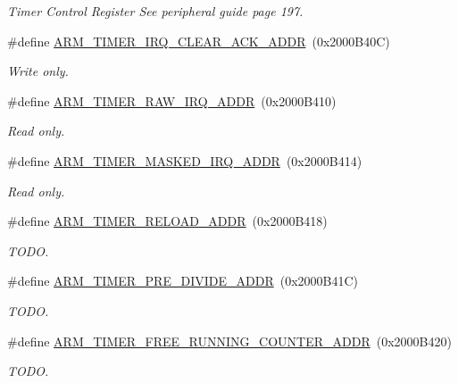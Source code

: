 \begin{DoxyCompactItemize}
\begin{DoxyCompactList}\small\item\em Timer Control Register See peripheral guide page 197. \end{DoxyCompactList}\item 
\#define \hyperlink{group__Peripherals_gab3e45c61e2102e07880830dc96c2fa70}{A\+R\+M\+\_\+\+T\+I\+M\+E\+R\+\_\+\+I\+R\+Q\+\_\+\+C\+L\+E\+A\+R\+\_\+\+A\+C\+K\+\_\+\+A\+D\+DR}~(0x2000\+B40\+C)
\begin{DoxyCompactList}\small\item\em Write only. \end{DoxyCompactList}\item 
\#define \hyperlink{group__Peripherals_ga2ccc9f962edeb13af9b2ef66be86bd3a}{A\+R\+M\+\_\+\+T\+I\+M\+E\+R\+\_\+\+R\+A\+W\+\_\+\+I\+R\+Q\+\_\+\+A\+D\+DR}~(0x2000\+B410)
\begin{DoxyCompactList}\small\item\em Read only. \end{DoxyCompactList}\item 
\#define \hyperlink{group__Peripherals_gaafd52e6e5cdf6b4b409b7e0fbdd05e03}{A\+R\+M\+\_\+\+T\+I\+M\+E\+R\+\_\+\+M\+A\+S\+K\+E\+D\+\_\+\+I\+R\+Q\+\_\+\+A\+D\+DR}~(0x2000\+B414)
\begin{DoxyCompactList}\small\item\em Read only. \end{DoxyCompactList}\item 
\#define \hyperlink{group__Peripherals_ga778de695286e2e164b1abd77fb282cb1}{A\+R\+M\+\_\+\+T\+I\+M\+E\+R\+\_\+\+R\+E\+L\+O\+A\+D\+\_\+\+A\+D\+DR}~(0x2000\+B418)
\begin{DoxyCompactList}\small\item\em T\+O\+DO. \end{DoxyCompactList}\item 
\#define \hyperlink{group__Peripherals_ga287e1e99292423e3f652a70f0e7b8462}{A\+R\+M\+\_\+\+T\+I\+M\+E\+R\+\_\+\+P\+R\+E\+\_\+\+D\+I\+V\+I\+D\+E\+\_\+\+A\+D\+DR}~(0x2000\+B41\+C)
\begin{DoxyCompactList}\small\item\em T\+O\+DO. \end{DoxyCompactList}\item 
\#define \hyperlink{group__Peripherals_ga30394a85f91a3fa5c6d45b62e3c75932}{A\+R\+M\+\_\+\+T\+I\+M\+E\+R\+\_\+\+F\+R\+E\+E\+\_\+\+R\+U\+N\+N\+I\+N\+G\+\_\+\+C\+O\+U\+N\+T\+E\+R\+\_\+\+A\+D\+DR}~(0x2000\+B420)
\begin{DoxyCompactList}\small\item\em T\+O\+DO. \end{DoxyCompactList}\item 

\end{DoxyCompactItemize}
